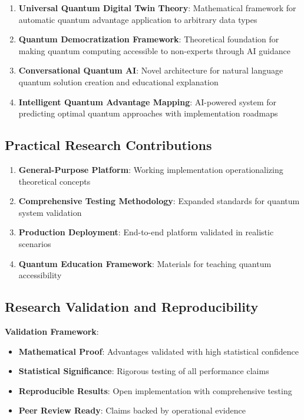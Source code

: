 \documentclass[12pt,a4paper]{article}
\begin{document}
\begin{enumerate}
    \item \textbf{Universal Quantum Digital Twin Theory}: Mathematical framework for automatic quantum advantage application to arbitrary data types
    \item \textbf{Quantum Democratization Framework}: Theoretical foundation for making quantum computing accessible to non-experts through AI guidance
    \item \textbf{Conversational Quantum AI}: Novel architecture for natural language quantum solution creation and educational explanation
    \item \textbf{Intelligent Quantum Advantage Mapping}: AI-powered system for predicting optimal quantum approaches with implementation roadmaps
\end{enumerate}

\subsection{Practical Research Contributions}

\begin{enumerate}
    \item \textbf{General-Purpose Platform}: Working implementation operationalizing theoretical concepts
    \item \textbf{Comprehensive Testing Methodology}: Expanded standards for quantum system validation  
    \item \textbf{Production Deployment}: End-to-end platform validated in realistic scenarios
    \item \textbf{Quantum Education Framework}: Materials for teaching quantum accessibility
\end{enumerate}

\subsection{Research Validation and Reproducibility}

\textbf{Validation Framework}:
\begin{itemize}
    \item \textbf{Mathematical Proof}: Advantages validated with high statistical confidence
    \item \textbf{Statistical Significance}: Rigorous testing of all performance claims
    \item \textbf{Reproducible Results}: Open implementation with comprehensive testing
    \item \textbf{Peer Review Ready}: Claims backed by operational evidence
\end{itemize}
\end{document}
